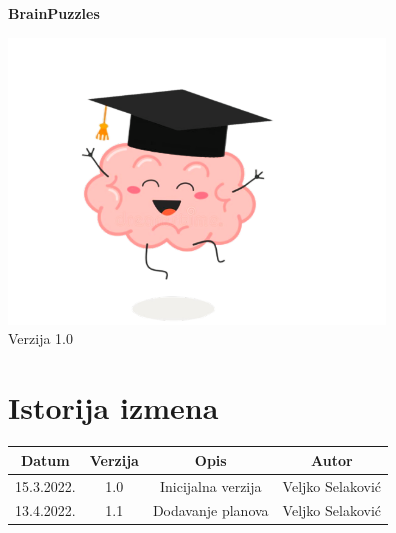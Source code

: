 \documentclass{article}
\date{}
\title{}
\begin{document}
\clearpage\maketitle
\thispagestyle{empty}
\providecommand{\inlinecode}[1]{\texttt{#1}}
\begin{center}
    \huge\textbf{BrainPuzzles}

    \hspace*{1cm}\includegraphics[width=10cm]{Resources/logo.png}\\
    \footnotesize Verzija 1.0

\end{center}
{\raggedleft\vfill{}\par
}
\newpage
\section*{Istorija izmena}
\vspace{1cm}
\begin{center}
\begin{tabular}{||c |c |c |c||} 
 \hline
 Datum & Verzija & Opis & Autor \\ [0.5ex] 
 \hline\hline
 15.3.2022. & 1.0 & Inicijalna verzija & Veljko Selaković \\ 
 \hline
 13.4.2022. & 1.1 & Dodavanje planova & Veljko Selaković \\
 \hline 
 \hline
\end{tabular}
\end{center}
\newpage
\tableofcontents
\end{document}
